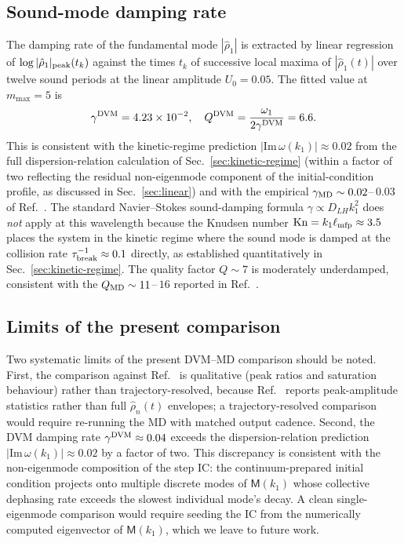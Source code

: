 \documentclass[aps,pre,twocolumn,superscriptaddress,longbibliography,floatfix]{revtex4-2}
\begin{document}
\subsection{Sound-mode damping rate}

The damping rate of the fundamental mode $|\hat\rho_1|$ is
extracted by linear regression of
$\log|\hat\rho_1|_{\rm peak}(t_k)$ against the times $t_k$ of
successive local maxima of $|\hat\rho_1(t)|$ over twelve
sound periods at the linear amplitude $U_0=0.05$. The fitted
value at $m_{\max}=5$ is
\begin{equation}
\gamma^{\rm DVM} = 4.23\times 10^{-2},
\quad
Q^{\rm DVM} = \frac{\omega_1}{2\gamma^{\rm DVM}} = 6.6.
\end{equation}
This is consistent with the kinetic-regime prediction
$|\mathrm{Im}\,\omega(k_1)|\approx 0.02$ from the full
dispersion-relation calculation of
Sec.~\ref{sec:kinetic-regime} (within a factor of two
reflecting the residual non-eigenmode component of the
initial-condition profile, as discussed in
Sec.~\ref{sec:linear}) and with the empirical
$\gamma_{\rm MD}\sim 0.02$--$\,0.03$ of
Ref.~\cite{PaperII}. The standard Navier--Stokes
sound-damping formula $\gamma\propto D_{LH}k_1^2$ does
\emph{not} apply at this wavelength because the Knudsen
number $\mathrm{Kn}=k_1\ell_{\rm mfp}\approx 3.5$ places the
system in the kinetic regime where the sound mode is damped
at the collision rate $\tau_{\rm break}^{-1}\approx 0.1$
directly, as established quantitatively in
Sec.~\ref{sec:kinetic-regime}. The quality factor $Q\sim 7$
is moderately underdamped, consistent with the
$Q_{\rm MD}\sim 11$--$\,16$ reported in Ref.~\cite{PaperII}.

\subsection{Limits of the present comparison}

Two systematic limits of the present DVM--MD comparison
should be noted. First, the comparison against
Ref.~\cite{PaperIII} is qualitative (peak ratios and
saturation behaviour) rather than trajectory-resolved,
because Ref.~\cite{PaperIII} reports peak-amplitude
statistics rather than full $\hat\rho_n(t)$ envelopes; a
trajectory-resolved comparison would require re-running
the MD with matched output cadence. Second, the DVM
damping rate $\gamma^{\rm DVM}\approx 0.04$ exceeds the
dispersion-relation prediction
$|\mathrm{Im}\,\omega(k_1)|\approx 0.02$ by a factor of
two. This discrepancy is consistent with the non-eigenmode
composition of the step IC: the continuum-prepared
initial condition projects onto multiple discrete modes of
$\mathsf{M}(k_1)$ whose collective dephasing rate exceeds
the slowest individual mode's decay. A clean
single-eigenmode comparison would require seeding the IC
from the numerically computed eigenvector of
$\mathsf{M}(k_1)$, which we leave to future work.
\end{document}
